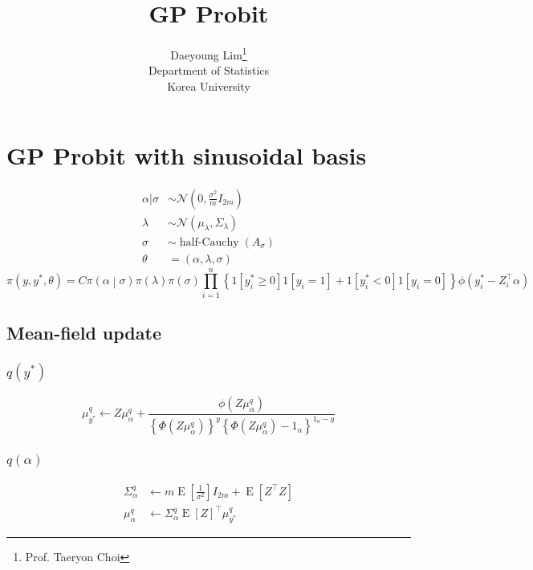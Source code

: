 \documentclass[11pt]{article}
\newcommand{\opn}{\operatorname}
\begin{document}
\nocite{*}

\title{GP Probit}

\author{Daeyoung Lim\thanks{Prof. Taeryon Choi} \\
Department of Statistics \\
Korea University}

\maketitle

\section{GP Probit with sinusoidal basis}
\begin{align*}
  \alpha|\sigma &\sim \mathcal{N}\left(0, \frac{\sigma^{2}}{m}I_{2m}\right)\\
  \lambda &\sim \mathcal{N}\left(\mu_{\lambda}, \Sigma_{\lambda}\right) \\
  \sigma &\sim \opn{half-Cauchy}\left(A_{\sigma}\right)\\
  \theta &= \left(\alpha, \lambda, \sigma \right)
\end{align*}
$$
  \pi\left(y, y^{*}, \theta\right) = C\pi\left(\alpha\middle|\sigma\right) \pi\left(\lambda\right)\pi\left(\sigma\right)\prod_{i=1}^{n}\left\{1\left[y_{i}^{*}\geq 0\right]1\left[y_{i}=1\right] +1\left[y_{i}^{*}<0\right]1\left[y_{i}=0\right] \right\}\phi\left(y_{i}^{*}-Z_{i}^{\top}\alpha\right)
$$
\subsection{Mean-field update}
\subsubsection{$q\left(y^{*}\right)$}
$$
  \mu_{y^{*}}^{q} \leftarrow Z\mu_{\alpha}^{q} + \frac{\phi\left(Z\mu_{\alpha}^{q}\right)}{\left\{\Phi\left(Z\mu_{\alpha}^{q}\right) \right\}^{y}\left\{\Phi\left(Z\mu_{\alpha}^{q}\right)-1_{n} \right\}^{1_{n}-y}}
$$
\subsubsection{$q\left(\alpha\right)$}
\begin{align*}
  \Sigma_{\alpha}^{q} &\leftarrow m\opn{E}\left[\frac{1}{\sigma^{2}}\right]I_{2m} +\opn{E}\left[Z^{\top}Z\right]\\
  \mu_{\alpha}^{q} &\leftarrow \Sigma_{\alpha}^{q}\opn{E}\left[Z\right]^{\top}\mu_{y^{*}}^{q}
\end{align*}
\end{document}
